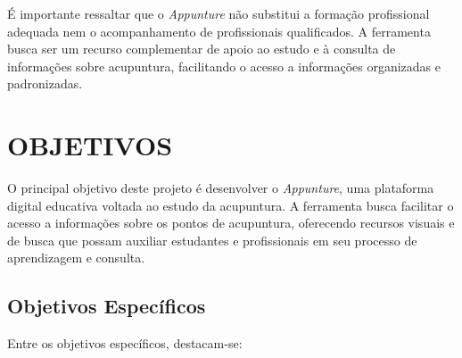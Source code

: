 É importante ressaltar que o \textit{Appunture} não substitui a formação profissional adequada nem o acompanhamento de profissionais qualificados. A ferramenta busca ser um recurso complementar de apoio ao estudo e à consulta de informações sobre acupuntura, facilitando o acesso a informações organizadas e padronizadas.

\section{OBJETIVOS} \label{sec:objetivos}

O principal objetivo deste projeto é desenvolver o \textit{Appunture}, uma plataforma digital educativa voltada ao estudo da acupuntura. A ferramenta busca facilitar o acesso a informações sobre os pontos de acupuntura, oferecendo recursos visuais e de busca que possam auxiliar estudantes e profissionais em seu processo de aprendizagem e consulta.

\subsection{Objetivos Específicos}

Entre os objetivos específicos, destacam-se:

